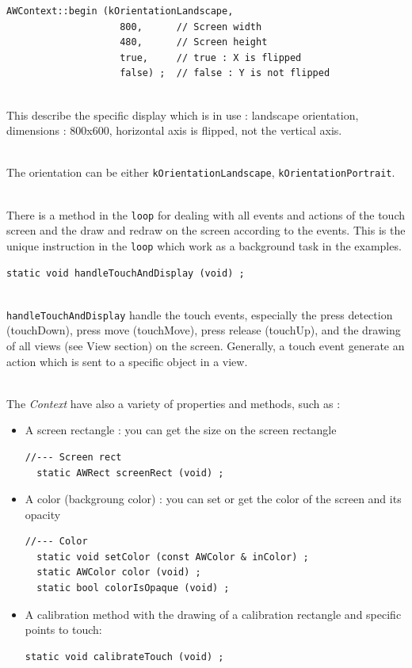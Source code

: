 \documentclass[a4paper,11pt]{extarticle}
\begin{document}
\begin{lstlisting}[language=Arduinonl]
 AWContext::begin (kOrientationLandscape,
                    800,      // Screen width
                    480,      // Screen height
                    true,     // true : X is flipped
                    false) ;  // false : Y is not flipped
\end{lstlisting}

~\\ This describe the specific display which is in use : landscape orientation, dimensions : 800x600, horizontal axis is flipped, not the vertical axis.

~\\ The orientation can be either \texttt{kOrientationLandscape}, \texttt{kOrientationPortrait}.

~\\ There is a method in the \texttt{loop} for dealing with all events and actions of the touch screen and the draw and redraw on the screen according to the events. This is the unique instruction in the \texttt{loop} which work as a background task in the examples.

\begin{lstlisting}[language=Arduinonl]
  static void handleTouchAndDisplay (void) ;
\end{lstlisting}

~\\ \texttt{handleTouchAndDisplay} handle the touch events, especially the press detection (touchDown), press move (touchMove), press release (touchUp), and the drawing of all views (see View section) on the screen. Generally, a touch event generate an action which is sent to a specific object in a view.

~\\ The \emph{Context} have also a variety of properties and methods, such as :

\begin{itemize}
\item A screen rectangle : you can get the size on the screen rectangle
\begin{lstlisting}[language=Arduinonl]
//--- Screen rect
  static AWRect screenRect (void) ;
\end{lstlisting}

\item A color (backgroung color) : you can set or get the color of the screen and its opacity
\begin{lstlisting}[language=Arduinonl]
//--- Color
  static void setColor (const AWColor & inColor) ;
  static AWColor color (void) ;
  static bool colorIsOpaque (void) ;
\end{lstlisting}

\item A calibration method  with the drawing of a calibration rectangle and specific points to touch: 
\begin{lstlisting}[language=Arduinonl]
static void calibrateTouch (void) ;
\end{lstlisting}

\end{itemize}
\end{document}

